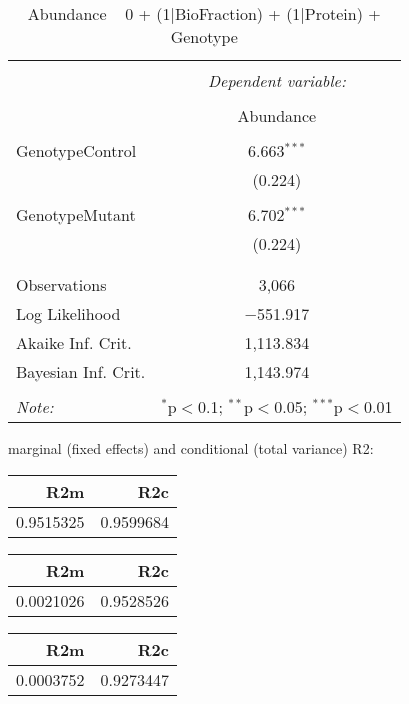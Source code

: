\documentclass[11pt]{report}
\begin{document}
\begin{table}[!htbp] \centering 
  \caption{Abundance ~ 0 + (1|BioFraction) + (1|Protein) + Genotype} 
  \label{} 
\begin{tabular}{@{\extracolsep{5pt}}lc} 
\\[-1.8ex]\hline 
\hline \\[-1.8ex] 
 & \multicolumn{1}{c}{\textit{Dependent variable:}} \\ 
\cline{2-2} 
\\[-1.8ex] & Abundance \\ 
\hline \\[-1.8ex] 
 GenotypeControl & 6.663$^{***}$ \\ 
  & (0.224) \\ 
  & \\ 
 GenotypeMutant & 6.702$^{***}$ \\ 
  & (0.224) \\ 
  & \\ 
\hline \\[-1.8ex] 
Observations & 3,066 \\ 
Log Likelihood & $-$551.917 \\ 
Akaike Inf. Crit. & 1,113.834 \\ 
Bayesian Inf. Crit. & 1,143.974 \\ 
\hline 
\hline \\[-1.8ex] 
\textit{Note:}  & \multicolumn{1}{r}{$^{*}$p$<$0.1; $^{**}$p$<$0.05; $^{***}$p$<$0.01} \\ 
\end{tabular} 
\end{table} 
marginal (fixed effects) and conditional (total variance) R2:

\begin{tabular}{r|r}
\hline
R2m & R2c\\
\hline
0.9515325 & 0.9599684\\
\hline
\end{tabular}

\begin{tabular}{r|r}
\hline
R2m & R2c\\
\hline
0.0021026 & 0.9528526\\
\hline
\end{tabular}

\begin{tabular}{r|r}
\hline
R2m & R2c\\
\hline
0.0003752 & 0.9273447\\
\hline
\end{tabular}
\end{document}

